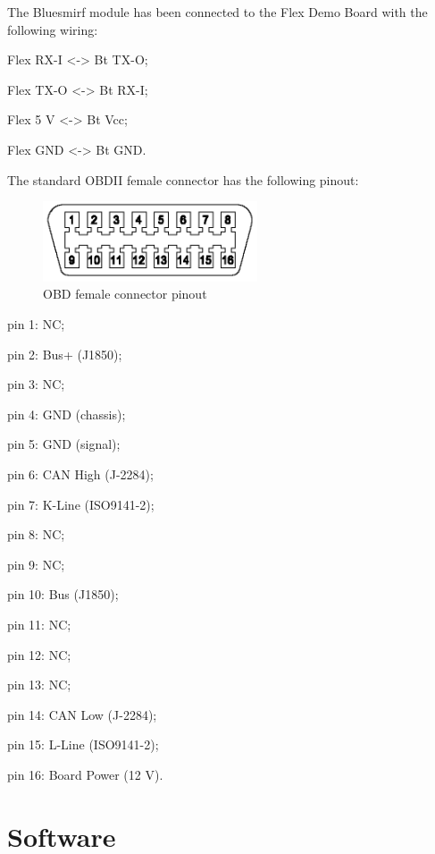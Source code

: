 \documentclass[twoside]{article}
\begin{document}
\begin{multicols}{2}
The Bluesmirf module has been connected to the Flex Demo Board with the following wiring:

\begin{compactitem}
\item Flex RX-I <-> Bt TX-O;
\item Flex TX-O <-> Bt RX-I;
\item Flex 5 V <-> Bt Vcc;
\item Flex GND <-> Bt GND.
\end{compactitem}

The standard OBDII female connector has the following pinout:

\begin{figure}[H]
  \centering
  \includegraphics[width=2.5in]{img/J1962_female_pinout}
  \caption{OBD female connector pinout}
\end{figure}

\begin{compactitem}
\item pin 1: NC;
\item pin 2: Bus+ (J1850);
\item pin 3: NC;
\item pin 4: GND (chassis);
\item pin 5: GND (signal);
\item pin 6: CAN High (J-2284);
\item pin 7: K-Line (ISO9141-2);
\item pin 8: NC;
\item pin 9: NC;
\item pin 10: Bus (J1850);
\item pin 11: NC;
\item pin 12: NC;
\item pin 13: NC;
\item pin 14: CAN Low (J-2284);
\item pin 15: L-Line (ISO9141-2);
\item pin 16: Board Power (12 V).
\end{compactitem}



\section{Software}


\end{multicols}
\end{document}
